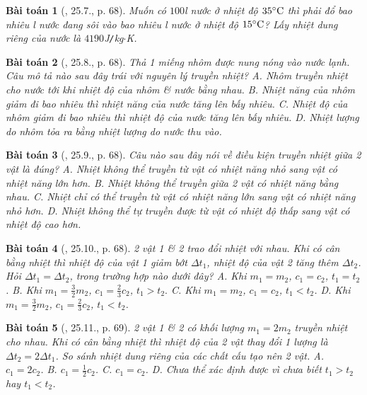 \documentclass{article}
\newtheorem{baitoan}{Bài toán}
\begin{document}
\begin{baitoan}[\cite{SBT_Vat_Ly_8}, 25.7., p. 68]
	Muốn có $100$\emph{l} nước ở nhiệt độ $35^\circ{\rm C}$ thì phải đổ bao nhiêu \emph{l} nước đang sôi vào bao nhiêu \emph{l} nước ở nhiệt độ $15^\circ{\rm C}$? Lấy nhiệt dung riêng của nước là $4190$\emph{J\texttt{/}kg$\cdot$K}.
\end{baitoan}

\begin{baitoan}[\cite{SBT_Vat_Ly_8}, 25.8., p. 68]
	Thả 1 miếng nhôm được nung nóng vào nước lạnh. Câu mô tả nào sau đây trái với nguyên lý truyền nhiệt? {\sf A.} Nhôm truyền nhiệt cho nước tới khi nhiệt độ của nhôm \& nước bằng nhau. {\sf B.} Nhiệt năng của nhôm giảm đi bao nhiêu thì nhiệt năng của nước tăng lên bấy nhiêu. {\sf C.} Nhiệt độ của nhôm giảm đi bao nhiêu thì nhiệt độ của nước tăng lên bấy nhiêu. {\sf D.} Nhiệt lượng do nhôm tỏa ra bằng nhiệt lượng do nước thu vào.
\end{baitoan}

\begin{baitoan}[\cite{SBT_Vat_Ly_8}, 25.9., p. 68]
	Câu nào sau đây nói về điều kiện truyền nhiệt giữa 2 vật là đúng? {\sf A.} Nhiệt không thể truyền từ vật có nhiệt năng nhỏ sang vật có nhiệt năng lớn hơn. {\sf B.} Nhiệt không thể truyền giữa 2 vật có nhiệt năng bằng nhau. {\sf C.} Nhiệt chỉ có thể truyền từ vật có nhiệt năng lớn sang vật có nhiệt năng nhỏ hơn. {\sf D.} Nhiệt không thể tự truyền được từ vật có nhiệt độ thấp sang vật có nhiệt độ cao hơn.
\end{baitoan}

\begin{baitoan}[\cite{SBT_Vat_Ly_8}, 25.10., p. 68]
	2 vật 1 \& 2 trao đổi nhiệt với nhau. Khi có cân bằng nhiệt thì nhiệt độ của vật 1 giảm bớt $\Delta t_1$, nhiệt độ của vật 2 tăng thêm $\Delta t_2$. Hỏi $\Delta t_1 = \Delta t_2$, trong trường hợp nào dưới đây? {\sf A.} Khi $m_1 = m_2$, $c_1 = c_2$, $t_1 = t_2$. {\sf B.} Khi $m_1  = \frac{3}{2}m_2$, $c_1 = \frac{2}{3}c_2$, $t_1 > t_2.$ {\sf C.} Khi $m_1 = m_2$, $c_1 = c_2$, $t_1 < t_2$. {\sf D.} Khi $m_1 = \frac{3}{2}m_2$, $c_1 = \frac{2}{3}c_2$, $t_1 < t_2$.
\end{baitoan}

\begin{baitoan}[\cite{SBT_Vat_Ly_8}, 25.11., p. 69]
	2 vật 1 \& 2 có khối lượng $m_1 = 2m_2$ truyền nhiệt cho nhau. Khi có cân bằng nhiệt thì nhiệt độ của 2 vật thay đổi 1 lượng là $\Delta t_2 = 2\Delta t_1$. So sánh nhiệt dung riêng của các chất cấu tạo nên 2 vật. {\sf A.} $c_1 = 2c_2$. {\sf B.} $c_1 = \frac{1}{2}c_2$. {\sf C.} $c_1 = c_2$. {\sf D.} Chưa thể xác định được vì chưa biết $t_1 > t_2$ hay $t_1 < t_2$.
\end{baitoan}
\end{document}
